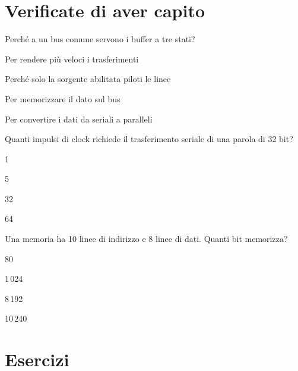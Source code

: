 



\section{Verificate di aver capito}

\begin{quiz}{Perché a un bus comune servono i buffer a tre stati?}
\item Per rendere più veloci i trasferimenti
\item Perché solo la sorgente abilitata piloti le linee
\item Per memorizzare il dato sul bus
\item Per convertire i dati da seriali a paralleli
\end{quiz}

\begin{quiz}{Quanti impulsi di clock richiede il trasferimento seriale di una parola di 32 bit?}
\item 1
\item 5
\item 32
\item 64
\end{quiz}

\begin{quiz}{Una memoria ha 10 linee di indirizzo e 8 linee di dati. Quanti bit memorizza?}
\item 80
\item 1\,024
\item 8\,192
\item 10\,240
\end{quiz}

\section{Esercizi}

